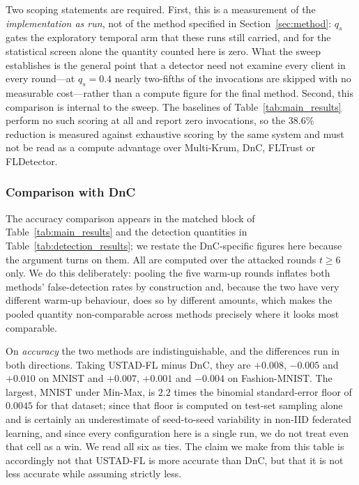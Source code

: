 \documentclass[journal]{IEEEtran}
\begin{document}
Two scoping statements are required. First, this is a measurement of the \emph{implementation
as run}, not of the method specified in Section~\ref{sec:method}: $q_s$ gates the exploratory
temporal arm that these runs still carried, and for the statistical screen alone the quantity
counted here is zero. What the sweep establishes is the general point that a detector need
not examine every client in every round---at $q_s = 0.4$ nearly two-fifths of the invocations
are skipped with no measurable cost---rather than a compute figure for the final method.
Second, this comparison is internal to the sweep. The baselines of
Table~\ref{tab:main_results} perform no such scoring at all and report zero invocations, so
the $38.6\%$ reduction is measured against exhaustive scoring by the same system and must not
be read as a compute advantage over Multi-Krum, DnC, FLTrust or FLDetector.

\subsubsection{Comparison with DnC}
The accuracy comparison appears in the matched block of Table~\ref{tab:main_results} and the detection quantities in Table~\ref{tab:detection_results}; we restate the DnC-specific figures here because the argument turns on them. All are computed over the attacked rounds $t \ge 6$ only. We do this deliberately: pooling the five warm-up rounds inflates both methods' false-detection rates by construction and, because the two have very different warm-up behaviour, does so by different amounts, which makes the pooled quantity non-comparable across methods precisely where it looks most comparable.

On \emph{accuracy} the two methods are indistinguishable, and the differences run in both directions. Taking USTAD-FL minus DnC, they are $+0.008$, $-0.005$ and $+0.010$ on MNIST and $+0.007$, $+0.001$ and $-0.004$ on Fashion-MNIST. The largest, MNIST under Min-Max, is $2.2$ times the binomial standard-error floor of $0.0045$ for that dataset; since that floor is computed on test-set sampling alone and is certainly an underestimate of seed-to-seed variability in non-IID federated learning, and since every configuration here is a single run, we do not treat even that cell as a win. We read all six as ties. The claim we make from this table is accordingly not that USTAD-FL is more accurate than DnC, but that it is not less accurate while assuming strictly less.
\end{document}

